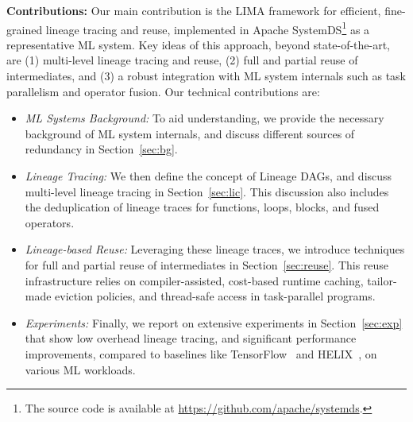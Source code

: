 \textbf{Contributions:} Our main contribution is the LIMA framework for efficient, fine-grained lineage tracing and reuse, implemented in Apache SystemDS\footnote{The source code is available at \url{https://github.com/apache/systemds}.} \cite{BoehmADGIKLPR20} as a representative ML system. Key ideas of this approach, beyond state-of-the-art, are (1) multi-level lineage tracing and reuse, (2) full and partial reuse of intermediates, and (3) a robust integration with ML system internals such as task parallelism and operator fusion. Our technical contributions are:
\begin{itemize}
\item \emph{ML Systems Background:} To aid understanding, we provide the necessary background of ML system internals, and discuss different sources of redundancy in Section~\ref{sec:bg}.
\item \emph{Lineage Tracing:} We then define the concept of Lineage DAGs, and discuss multi-level lineage tracing in Section~\ref{sec:lic}. This discussion also includes the deduplication of lineage traces for functions, loops, blocks, and fused operators. 
\item \emph{Lineage-based Reuse:} Leveraging these lineage traces, we introduce techniques for full and partial reuse of intermediates in Section~\ref{sec:reuse}. This reuse infrastructure relies on compiler-assisted, cost-based runtime caching, tailor-made eviction policies, and thread-safe access in task-parallel programs.
\item \emph{Experiments:} Finally, we report on extensive experiments in Section~\ref{sec:exp} that show low overhead lineage tracing, and significant performance improvements, compared to baselines like TensorFlow~\cite{AbadiBCCDDDGIIK16} and HELIX~\cite{XinMMLSP18}, on various ML workloads.
\end{itemize}
 
